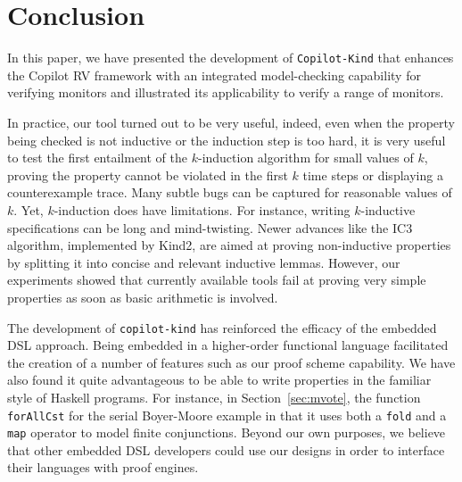 \section{Conclusion}\label{sec:conclusion}

In this paper, we have presented the development of
\texttt{Copilot-Kind} that enhances the Copilot RV framework with an
integrated model-checking capability for verifying monitors and
illustrated its applicability to verify a range of monitors.

In practice, our tool turned out to be very useful, indeed, even when
the property being checked is not inductive or the induction step is
too hard, it is very useful to test the first entailment of the
$k$-induction algorithm for small values of $k$, proving the property
cannot be violated in the first $k$ time steps or displaying a
counterexample trace. Many subtle bugs can be captured for reasonable
values of $k$. Yet, $k$-induction does have limitations. For instance, writing $k$-inductive
specifications can be long and mind-twisting. Newer advances like the
\textsc{IC}3 algorithm, implemented by Kind2, are aimed at proving
non-inductive properties by splitting it into concise and relevant
inductive lemmas. However, our experiments showed that currently
available tools fail at proving very simple properties as soon as
basic arithmetic is involved.

The development of \texttt{copilot-kind} has reinforced the efficacy
of the embedded DSL approach. Being embedded in a higher-order
functional language facilitated the creation of a number of features
such as our proof scheme capability. We have also found it quite
advantageous to be able to write properties in the familiar style of
Haskell programs. For instance, in Section~\ref{sec:mvote}, the
function \texttt{forAllCst} for the serial Boyer-Moore example in that
it uses both a \texttt{fold} and a \texttt{map} operator to model
finite conjunctions.  Beyond our own purposes, we believe that other
embedded DSL developers could use our designs in order to interface
their languages with proof engines.


